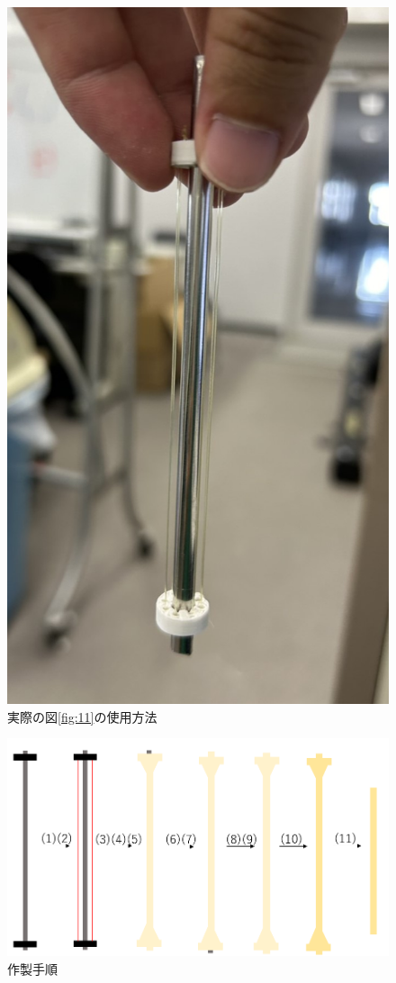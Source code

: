 \begin{figure}[ht]
\begin{minipage}[b]{0.49\hsize}
    \includegraphics[scale=0.1]{pic/tukau.jpg}
    \caption{実際の図\ref{fig:11}の使用方法}
    \label{fig:14}
  \end{minipage}
  \end{figure}
  \begin{figure}[htbp]
  \centering  %
  \includegraphics[scale=0.3]{pic/14.PNG}
  \caption{作製手順}
  \label{fig:15}
\end{figure}
